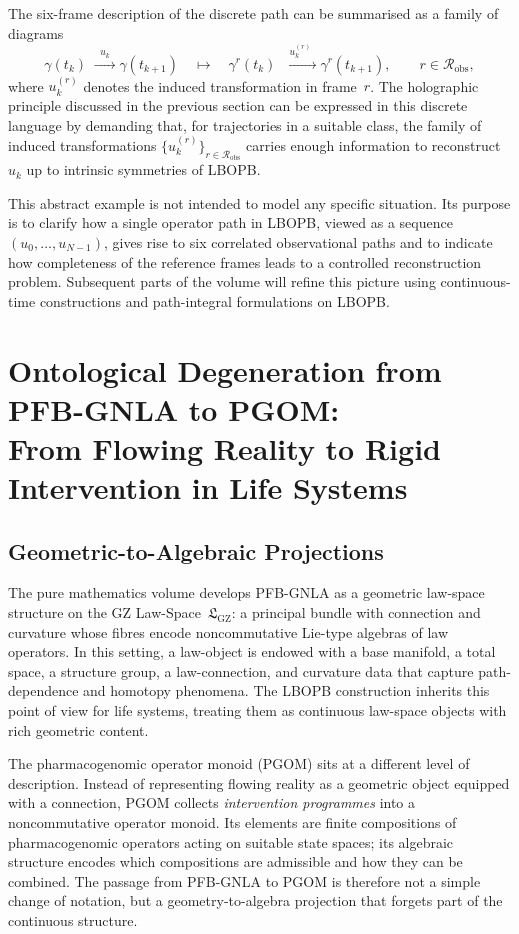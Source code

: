 \documentclass[11pt]{book}
\theoremstyle{plain}
\theoremstyle{definition}
\theoremstyle{remark}
\newcommand{\GZLS}{\ensuremath{\mathfrak{L}_{\mathrm{GZ}}}}       \newcommand{\GZLT}{\ensuremath{M_{!w}}}                           \newcommand{\GZLOC}{\ensuremath{A_M}}                             \newcommand{\GZLCurv}{\ensuremath{\mathcal{F}_{\mathrm{law}}}}
\begin{document}
The six-frame description of the discrete path can be summarised as a
family of diagrams
\[
  \gamma(t_{k})
  \;\xrightarrow{\;\; u_{k} \;\;}
  \gamma(t_{k+1})
  \quad\longmapsto\quad
  \gamma^{r}(t_{k})
  \;\xrightarrow{\;\; u_{k}^{(r)} \;\;}
  \gamma^{r}(t_{k+1}),
  \qquad r \in \mathcal{R}_{\mathrm{obs}},
\]
where $u_{k}^{(r)}$ denotes the induced transformation in frame~$r$.
The holographic principle discussed in the previous section can be
expressed in this discrete language by demanding that, for trajectories
in a suitable class, the family of induced transformations
$\{u_{k}^{(r)}\}_{r \in \mathcal{R}_{\mathrm{obs}}}$ carries enough
information to reconstruct $u_{k}$ up to intrinsic symmetries of
LBOPB.

This abstract example is not intended to model any specific situation.
Its purpose is to clarify how a single operator path in LBOPB, viewed
as a sequence $(u_{0},\dots,u_{N-1})$, gives rise to six correlated
observational paths and to indicate how completeness of the reference
frames leads to a controlled reconstruction problem. Subsequent parts
of the volume will refine this picture using continuous-time
constructions and path-integral formulations on LBOPB.

\chapter[Ontological Degeneration from PFB-GNLA to PGOM]{Ontological Degeneration from PFB-GNLA to PGOM:\\
         From Flowing Reality to Rigid Intervention in Life Systems}


\section{Geometric-to-Algebraic Projections}


The pure mathematics volume develops PFB-GNLA as a geometric law-space
structure on the GZ Law-Space~$\GZLS$: a principal bundle with
connection and curvature whose fibres encode noncommutative Lie-type
algebras of law operators. In this setting, a law-object is endowed
with a base manifold, a total space, a structure group, a
law-connection, and curvature data that capture path-dependence and
homotopy phenomena. The LBOPB construction inherits this point of view
for life systems, treating them as continuous law-space objects with
rich geometric content.

The pharmacogenomic operator monoid (PGOM) sits at a different level
of description. Instead of representing flowing reality as a geometric
object equipped with a connection, PGOM collects \emph{intervention
programmes} into a noncommutative operator monoid. Its elements are
finite compositions of pharmacogenomic operators acting on suitable
state spaces; its algebraic structure encodes which compositions are
admissible and how they can be combined. The passage from PFB-GNLA to
PGOM is therefore not a simple change of notation, but a
geometry-to-algebra projection that forgets part of the continuous
structure.
\end{document}
